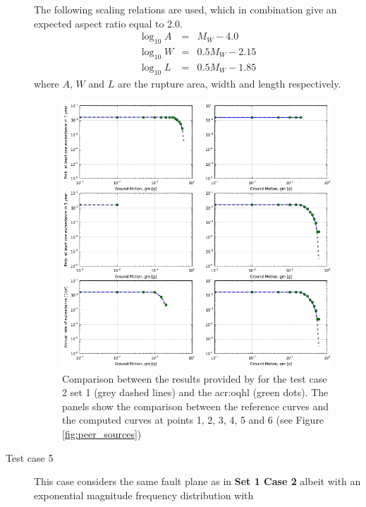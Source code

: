 \begin{description}
        The following scaling relations are used, which in combination give 
        an expected aspect ratio equal to 2.0.
        \begin{eqnarray}
        \log_{10} A &=& M_W - 4.0\\
        \log_{10} W &=& 0.5 M_W - 2.15\\
        \log_{10} L &=& 0.5 M_W - 1.85
        \end{eqnarray}
        where $A$, $W$ and $L$ are the rupture area, width and length
        respectively.
\begin{figure}[!ht]
\centering
\includegraphics[width=14cm]{./Pictures/qa/test02_set1.png}
\caption{Comparison between the results provided by \textcite{thomas2010}
for the test case 2 set 1 (grey dashed lines) and the \gls{acr:oqhl} 
(green dots). The panels show the comparison between the reference curves and 
the computed curves at points 1, 2, 3, 4, 5 and 6 
(see Figure \ref{fig:peer_sources})}
\label{fig:peer_set1_test2}
\end{figure}
    \clearpage
    \item [Test case 5]
    This case considers the same fault plane as in \textbf{Set 1 Case 2} 
    albeit with an exponential magnitude frequency distribution with 

\end{description}
